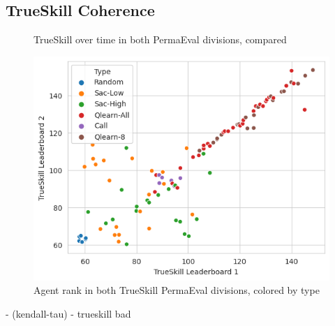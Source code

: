 \subsection{TrueSkill Coherence}
\begin{figure}[H]
\centering
{}
\caption{TrueSkill over time in both PermaEval divisions, compared}
\label{TrueSkillCompare}
\end{figure}

\begin{figure}[H]
\centering
    \includegraphics[width=0.8\linewidth]{Results/figures/trueskill_comparison.png}
\caption{Agent rank in both TrueSkill PermaEval divisions, colored by type}
\label{TrueSkillCompare2}
\end{figure}
\begin{code}
    - (kendall-tau)
    - trueskill bad
\end{code}

